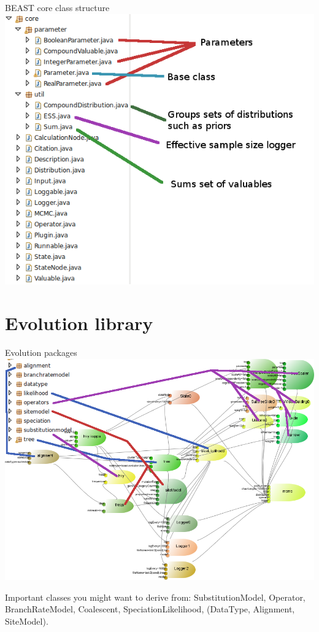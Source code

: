 \documentclass{beamer}
\theoremstyle{definition}
\begin{document}
\begin{frame}{BEAST core class structure}
\includegraphics[width=\textwidth]{classes4.png}
\end{frame}


\section{Evolution library}

\begin{frame}[containsverbatim]{Evolution packages}
\includegraphics[width=\textwidth]{classes5b.png}

Important classes you might want to derive from: SubstitutionModel, Operator, 
BranchRateModel, Coalescent, SpeciationLikelihood, (DataType, Alignment,
SiteModel).
\end{frame}
\end{document}
